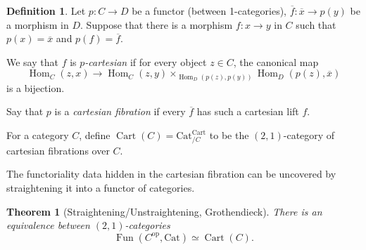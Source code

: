 \documentclass[11pt]{article}
\newtheorem{theorem}{Theorem}
\theoremstyle{definition}
\newtheorem{definition}{Definition}
\newcommand{\Cart}{\operatorname{Cart}}
\newcommand{\Cat}{\mathrm{Cat}}
\newcommand{\Fun}{\operatorname{Fun}}
\newcommand{\Hom}{\operatorname{Hom}}
\newcommand{\op}{\mathrm{op}}
\begin{document}
\begin{definition}
    Let $p : C \to D$ be a functor (between 1-categories), $\overline{f} : \overline{x} \to p(y)$ be a morphism in $D$.
    Suppose that there is a morphism $f : x \to y$ in $C$ such that $p(x) = \overline{x}$ and $p(f) = \overline{f}$.

    We say that $f$ is \emph{$p$-cartesian} if for every object $z \in C$, the canonical map
    \[
        \Hom_C(z, x) \to \Hom_C(z, y) \times_{\Hom_D(p(z), p(y))} \Hom_D(p(z), \overline{x})
    \]
    is a bijection.

    Say that $p$ is a \emph{cartesian fibration} if every $\overline{f}$ has such a cartesian lift $f$.
\end{definition}

For a category $C$, define $\Cart(C) = \Cat_{/C}^{\Cart}$ to be the $(2, 1)$-category of cartesian fibrations over $C$.

The functoriality data hidden in the cartesian fibration can be uncovered by straightening it into a functor of categories.
\begin{theorem}[Straightening/Unstraightening, Grothendieck]
    There is an equivalence between $(2, 1)$-categories
    \[
        \Fun(C^{\op}, \Cat) \simeq \Cart(C).
    \]
\end{theorem}
\end{document}
